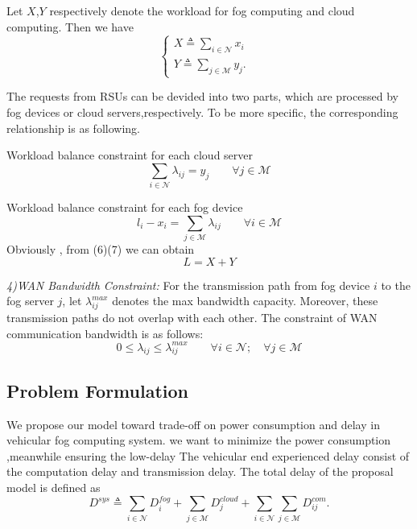 \documentclass[twoside,twocolumn]{article}
\begin{document}
Let $\mathit{X}$,$\mathit{Y}$ respectively denote the workload for fog computing and cloud computing. Then we have
$$
\left\{
\begin{array}{lr}
\mathit{X} \triangleq \sum_{i \in \mathcal{N}} x_i &  \\
\mathit{Y} \triangleq \sum_{j \in \mathcal{M}} y_j. &
\end{array}
\right.
$$

The requests from RSUs can be devided into two parts, which are processed by fog devices or cloud servers,respectively. To be more specific, the corresponding relationship is as following.

Workload balance constraint for each cloud server
\begin{equation}
\sum_{i \in \mathcal{N}} \lambda_{ij} = y_j \qquad \forall j \in \mathcal{M}
\end{equation}

Workload balance constraint for each fog device
\begin{equation}
l_i - x_i = \sum_{j \in \mathcal{M}} \lambda_{ij} \qquad \forall i \in \mathcal{M}
\end{equation}
Obviously , from (6)(7) we can obtain 
\begin{equation}
L = X+Y
\end{equation}

\textit{4)WAN Bandwidth Constraint:} For the transmission path from fog device $i$ to the fog server $j$, let $\lambda_{ij}^{max}$ denotes the max bandwidth capacity. Moreover, these transmission paths do not overlap with each other. The constraint of WAN communication bandwidth is as follows:
\begin{equation}
0 \leq \lambda_{ij} \leq \lambda_{ij}^{max} \qquad \forall i \in \mathcal{N}; \quad \forall j \in \mathcal{M}
\end{equation}
\subsection{Problem Formulation}
We propose our model toward trade-off on power consumption and delay in vehicular fog computing system. we want to minimize the power consumption ,meanwhile ensuring the low-delay	The vehicular end experienced delay consist of the computation delay and transmission delay.
The total delay of the proposal model is defined as 
$$
D^{sys} \triangleq \sum_{i \in \mathcal{N}} D_i^{fog} + \sum_{j \in \mathcal{M}} D_j^{cloud} + \sum_{i \in \mathcal{N}}\sum_{j \in \mathcal{M}} D_{ij}^{com}.
$$
\end{document}
